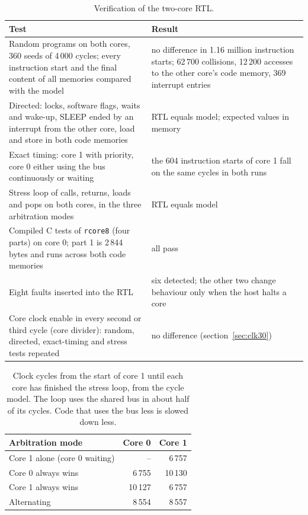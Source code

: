 \documentclass[10pt,a4paper]{article}
\begin{document}
\begin{table}[H]
\centering\small
\begin{tabularx}{\linewidth}{@{}LL@{}}
\toprule
Test & Result \\
\midrule
Random programs on both cores, 360 seeds of 4\,000 cycles; every instruction start and the final content of all memories compared with the model & no difference in 1.16 million instruction starts; 62\,700 collisions, 12\,200 accesses to the other core's code memory, 369 interrupt entries \\
Directed: locks, software flags, waits and wake-up, SLEEP ended by an interrupt from the other core, load and store in both code memories & RTL equals model; expected values in memory \\
Exact timing: core 1 with priority, core 0 either using the bus continuously or waiting & the 604 instruction starts of core 1 fall on the same cycles in both runs \\
Stress loop of calls, returns, loads and pops on both cores, in the three arbitration modes & RTL equals model \\
Compiled C tests of \texttt{rcore8} (four parts) on core 0; part 1 is 2\,844 bytes and runs across both code memories & all pass \\
Eight faults inserted into the RTL & six detected; the other two change behaviour only when the host halts a core \\
Core clock enable in every second or third cycle (core divider): random, directed, exact-timing and stress tests repeated & no difference (section~\ref{sec:clk30}) \\
\bottomrule
\end{tabularx}
\caption{Verification of the two-core RTL.}
\end{table}

\begin{table}[H]
\centering\small
\begin{tabular}{@{}lrr@{}}
\toprule
Arbitration mode & Core 0 & Core 1 \\
\midrule
Core 1 alone (core 0 waiting) & -- & 6\,757 \\
Core 0 always wins & 6\,755 & 10\,130 \\
Core 1 always wins & 10\,127 & 6\,757 \\
Alternating & 8\,554 & 8\,557 \\
\bottomrule
\end{tabular}
\caption{Clock cycles from the start of core 1 until each core has finished the stress loop, from the cycle
model. The loop uses the shared bus in about half of its cycles. Code that uses the bus less is slowed down
less.}
\end{table}
\end{document}
